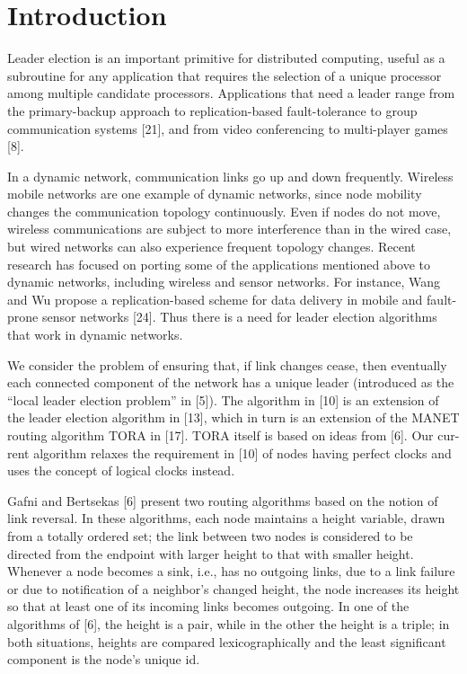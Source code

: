 \chapter{Introduction}

Leader election is an important primitive for distributed computing, useful as a subroutine for any application that requires the selection of a unique processor among multiple candidate processors. Applications that need a leader range from the primary-backup approach to replication-based fault-tolerance to group communication systems [21], and from video conferencing to multi-player games [8].

In a dynamic network, communication links go up and down frequently. Wireless mobile networks are one example of dynamic networks, since node mobility changes the communication topology continuously. Even if nodes do not move, wireless communications are subject to more interference than in the wired case, but wired networks can also experience frequent topology changes. Recent research has focused on porting some of the applications mentioned above to dynamic networks, including wireless and sensor networks. For instance, Wang and Wu propose a replication-based scheme for data delivery in mobile and fault-prone sensor networks [24]. Thus there is a need for leader election algorithms that work in dynamic networks.

We consider the problem of ensuring that, if link changes cease, then eventually each connected component of the network has a unique leader (introduced as the “local leader election problem” in [5]). The algorithm in [10] is an extension of the leader election algorithm in [13], which in turn is an extension of the MANET routing algorithm TORA in [17]. TORA itself is based on ideas from [6]. Our cur- rent algorithm relaxes the requirement in [10] of nodes having perfect clocks and uses the concept of logical clocks instead.

Gafni and Bertsekas [6] present two routing algorithms based on the notion of link reversal. In these algorithms, each node maintains a height variable, drawn from a totally ordered set; the link between two nodes is considered to be directed from the endpoint with larger height to that with smaller height. Whenever a node becomes a sink, i.e., has no outgoing links, due to a link failure or due to notification of a neighbor’s changed height, the node increases its height so that at least one of its incoming links becomes outgoing. In one of the algorithms of [6], the height is a pair, while in the other the height is a triple; in both situations, heights are compared lexicographically and the least significant component is the node’s unique id.

